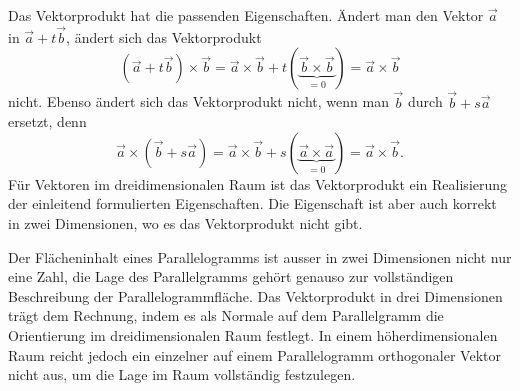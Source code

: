 Das Vektorprodukt hat die passenden Eigenschaften.
Ändert man den Vektor $\vec{a}$ in $\vec{a}+t\vec{b}$, ändert sich das
Vektorprodukt
\begin{equation}
(\vec{a}+t\vec{b})\times\vec{b}
=
\vec{a}\times\vec{b} + t(\underbrace{\vec{b}\times\vec{b}}_{\displaystyle=0})
=
\vec{a}\times\vec{b}
\label{buch:green:2vektoren:eqn:parallelogramm1}
\end{equation}
nicht.
Ebenso ändert sich das Vektorprodukt nicht, wenn man $\vec{b}$ durch
$\vec{b}+s\vec{a}$ ersetzt, denn
\begin{equation}
\vec{a}\times(\vec{b}+s\vec{a})
=
\vec{a}\times\vec{b}
+
s(\underbrace{\vec{a}\times\vec{a}}_{\displaystyle=0})
=
\vec{a}\times\vec{b}.
\label{buch:green:2vektoren:eqn:parallelogramm2}
\end{equation}
Für Vektoren im dreidimensionalen Raum ist das Vektorprodukt ein 
Realisierung der einleitend formulierten Eigenschaften.
Die Eigenschaft ist aber auch korrekt in zwei Dimensionen, wo es
das Vektorprodukt nicht gibt.

Der Flächeninhalt eines Parallelogramms ist ausser in zwei Dimensionen
nicht nur eine Zahl, die Lage des Parallelgramms gehört genauso zur
vollständigen Beschreibung der Parallelogrammfläche.
Das Vektorprodukt in drei Dimensionen trägt dem Rechnung, indem
es als Normale auf dem Parallelgramm die Orientierung im dreidimensionalen
Raum festlegt.
In einem höherdimensionalen Raum reicht jedoch ein einzelner auf
einem Parallelogramm orthogonaler Vektor nicht aus, um die Lage im
Raum vollständig festzulegen.

